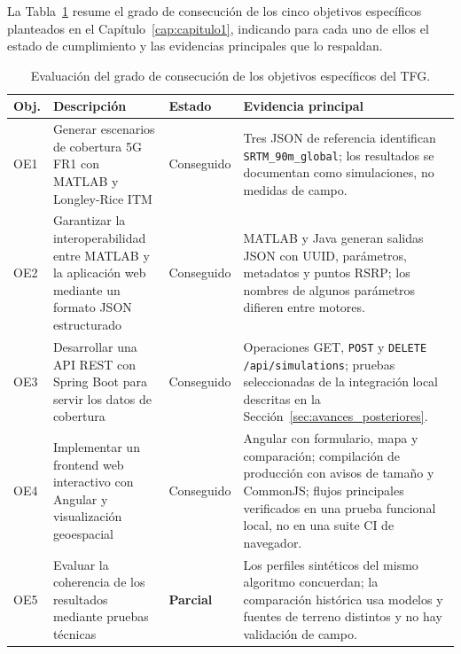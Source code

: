 La Tabla~\ref{tab:objetivos_conseguidos} resume el grado de consecución de los cinco objetivos específicos planteados en el Capítulo~\ref{cap:capitulo1}, indicando para cada uno de ellos el estado de cumplimiento y las evidencias principales que lo respaldan.

\begin{table}[htbp]
\centering
\caption{Evaluación del grado de consecución de los objetivos específicos del TFG.}
\label{tab:objetivos_conseguidos}
\begin{tabularx}{\textwidth}{>{\raggedright\arraybackslash}p{1.2cm}X>{\centering\arraybackslash}p{2.5cm}X}
\toprule
\textbf{Obj.} & \textbf{Descripción} & \textbf{Estado} & \textbf{Evidencia principal} \\
\midrule
OE1 & Generar escenarios de cobertura 5G FR1 con MATLAB y Longley-Rice ITM & \textcolor{green!60!black}{Conseguido} & Tres JSON de referencia identifican \texttt{SRTM\_90m\_global}; los resultados se documentan como simulaciones, no medidas de campo. \\
\midrule
OE2 & Garantizar la interoperabilidad entre MATLAB y la aplicación web mediante un formato JSON estructurado & \textcolor{green!60!black}{Conseguido} & MATLAB y Java generan salidas JSON con UUID, parámetros, metadatos y puntos RSRP; los nombres de algunos parámetros difieren entre motores. \\
\midrule
OE3 & Desarrollar una API REST con Spring Boot para servir los datos de cobertura & \textcolor{green!60!black}{Conseguido} & Operaciones GET, \texttt{POST} y \texttt{DELETE /api/simulations}; pruebas seleccionadas de la integración local descritas en la Sección~\ref{sec:avances_posteriores}. \\
\midrule
OE4 & Implementar un frontend web interactivo con Angular y visualización geoespacial & \textcolor{green!60!black}{Conseguido} & Angular con formulario, mapa y comparación; compilación de producción con avisos de tamaño y CommonJS; flujos principales verificados en una prueba funcional local, no en una suite CI de navegador. \\
\midrule
OE5 & Evaluar la coherencia de los resultados mediante pruebas técnicas & \textbf{Parcial} & Los perfiles sintéticos del mismo algoritmo concuerdan; la comparación histórica usa modelos y fuentes de terreno distintos y no hay validación de campo. \\
\bottomrule
\end{tabularx}
\end{table}

